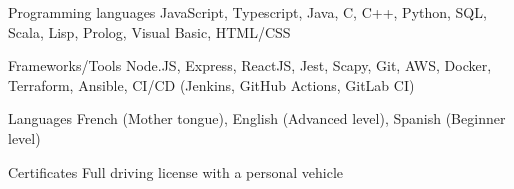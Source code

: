 
\begin{cvskills}
  \cvskill
    {Programming languages} %
    {JavaScript, Typescript, Java, C, C++, Python, SQL, Scala, Lisp, Prolog, Visual Basic, HTML/CSS} %

  \cvskill
    {Frameworks/Tools} %
    {Node.JS, Express, ReactJS, Jest, Scapy, Git, AWS, Docker, Terraform, Ansible, CI/CD (Jenkins, GitHub Actions, GitLab CI)} %
    
  \cvskill
    {Languages} %
    {French (Mother tongue), English (Advanced level), Spanish (Beginner level)} %
    
  \cvskill
    {Certificates} %
    {Full driving license with a personal vehicle} %
\end{cvskills}
